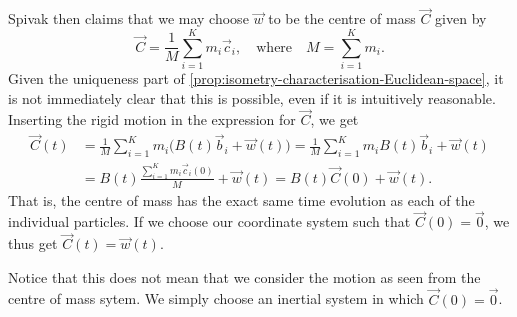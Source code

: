 \documentclass[article, a4paper, 11pt, oneside]{memoir}
\numberwithin{equation}{chapter}
\begin{document}
Spivak then claims that we may choose $\vec{w}$ to be the centre of mass $\vec{C}$ given by
%
\begin{equation*}
    \vec{C}
        = \frac{1}{M} \sum_{i=1}^K m_i \vec{c}_i,
        \quad \text{where} \quad
        M = \sum_{i=1}^K m_i.
\end{equation*}
%
Given the uniqueness part of \cref{prop:isometry-characterisation-Euclidean-space}, it is not immediately clear that this is possible, even if it is intuitively reasonable. Inserting the rigid motion in the expression for $\vec{C}$, we get
%
\begin{align*}
    \vec{C}(t)
        &= \frac{1}{M} \sum_{i=1}^K m_i \bigl( B(t) \vec{b}_i + \vec{w}(t) \bigr)
         = \frac{1}{M} \sum_{i=1}^K m_i B(t) \vec{b}_i + \vec{w}(t) \\
        &= B(t) \frac{ \sum_{i=1}^K m_i \vec{c}_i(0) }{M} + \vec{w}(t)
         = B(t) \vec{C}(0) + \vec{w}(t).
\end{align*}
%
That is, the centre of mass has the exact same time evolution as each of the individual particles. If we choose our coordinate system such that $\vec{C}(0) = \vec{0}$, we thus get $\vec{C}(t) = \vec{w}(t)$.

Notice that this does not mean that we consider the motion as seen from the centre of mass sytem. We simply choose an inertial system in which $\vec{C}(0) = \vec{0}$.
\end{document}
